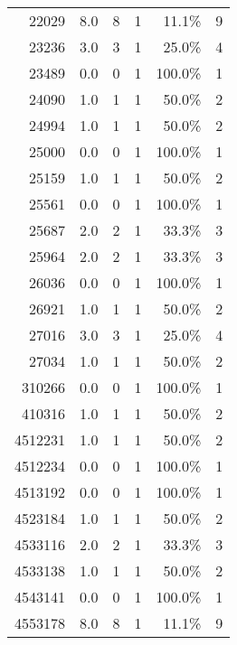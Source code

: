 \begin{longtable}{lrrrrr}
	    \multicolumn{1}{r}{22029} & 8.0   & 8     & 1     & 11.1\% & 9 \\
	    \multicolumn{1}{r}{23236} & 3.0   & 3     & 1     & 25.0\% & 4 \\
	    \multicolumn{1}{r}{23489} & 0.0   & 0     & 1     & 100.0\% & 1 \\
	    \multicolumn{1}{r}{24090} & 1.0   & 1     & 1     & 50.0\% & 2 \\
	    \multicolumn{1}{r}{24994} & 1.0   & 1     & 1     & 50.0\% & 2 \\
	    \multicolumn{1}{r}{25000} & 0.0   & 0     & 1     & 100.0\% & 1 \\
	    \multicolumn{1}{r}{25159} & 1.0   & 1     & 1     & 50.0\% & 2 \\
	    \multicolumn{1}{r}{25561} & 0.0   & 0     & 1     & 100.0\% & 1 \\
	    \multicolumn{1}{r}{25687} & 2.0   & 2     & 1     & 33.3\% & 3 \\
	    \multicolumn{1}{r}{25964} & 2.0   & 2     & 1     & 33.3\% & 3 \\
	    \multicolumn{1}{r}{26036} & 0.0   & 0     & 1     & 100.0\% & 1 \\
	    \multicolumn{1}{r}{26921} & 1.0   & 1     & 1     & 50.0\% & 2 \\
	    \multicolumn{1}{r}{27016} & 3.0   & 3     & 1     & 25.0\% & 4 \\
	    \multicolumn{1}{r}{27034} & 1.0   & 1     & 1     & 50.0\% & 2 \\
	    \multicolumn{1}{r}{310266} & 0.0   & 0     & 1     & 100.0\% & 1 \\
	    \multicolumn{1}{r}{410316} & 1.0   & 1     & 1     & 50.0\% & 2 \\
	    \multicolumn{1}{r}{4512231} & 1.0   & 1     & 1     & 50.0\% & 2 \\
	    \multicolumn{1}{r}{4512234} & 0.0   & 0     & 1     & 100.0\% & 1 \\
	    \multicolumn{1}{r}{4513192} & 0.0   & 0     & 1     & 100.0\% & 1 \\
	    \multicolumn{1}{r}{4523184} & 1.0   & 1     & 1     & 50.0\% & 2 \\
	    \multicolumn{1}{r}{4533116} & 2.0   & 2     & 1     & 33.3\% & 3 \\
	    \multicolumn{1}{r}{4533138} & 1.0   & 1     & 1     & 50.0\% & 2 \\
	    \multicolumn{1}{r}{4543141} & 0.0   & 0     & 1     & 100.0\% & 1 \\
	    \multicolumn{1}{r}{4553178} & 8.0   & 8     & 1     & 11.1\% & 9 \\

\end{longtable}
